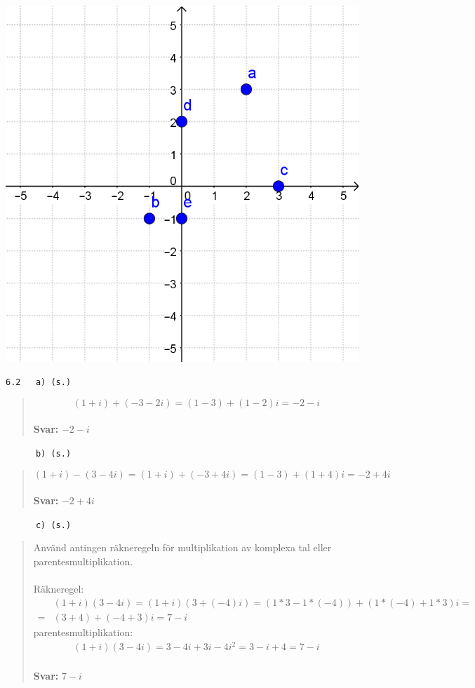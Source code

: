 \documentclass[a4paper]{article}
\newcommand{\tskcol}[1]{\textcolor{tskcol}{#1}}
\begin{document}
	\includegraphics[scale=0.2]{images/61.PNG}
	
	\texttt{\tskcol{6.2~~~a) (s.)}}
	\begin{quotation}
		\noindent
		\[(1+i)+(-3-2i)=(1-3)+(1-2)i=-2-i\]
		\\
		\textbf{Svar:} $-2-i$
	\end{quotation}
	
	\pagebreak
	\texttt{\tskcol{~~~~~~b) (s.)}}
	\begin{quotation}
		\noindent
		\[(1+i)-(3-4i)=(1+i)+(-3+4i)=(1-3)+(1+4)i=-2+4i\]
		\\
		\textbf{Svar:} $-2+4i$
	\end{quotation}
	
	\texttt{\tskcol{~~~~~~c) (s.)}}
	\begin{quotation}
		\noindent
		Använd antingen räkneregeln för multiplikation av komplexa tal eller parentesmultiplikation. \\ \\
		Räkneregel:
		\begin{align*}
		&(1+i)(3-4i)=
		(1+i)(3+(-4)i)=
		(1*3-1*(-4))+(1*(-4)+1*3)i= \\ =
		&(3+4)+(-4+3)i=
		7-i
		\end{align*}
		parentesmultiplikation:
		\begin{align*}
		(1+i)(3-4i)=
		3-4i+3i-4i^2=
		3-i+4=
		7-i
		\end{align*}
		\\
		\textbf{Svar:} $7-i$
	\end{quotation}
	
\end{document}
